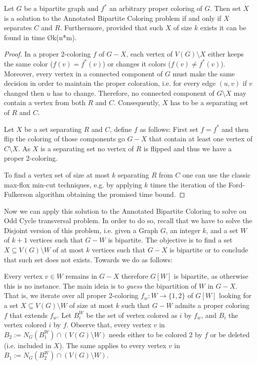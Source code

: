 \begin{lemma}\label{lemma:annotated-bipartite-coloring}
  Let $G$ be a bipartite graph and $f^*$ an arbitrary proper coloring of $G$.
  Then set $X$ is a solution to the Annotated Bipartite Coloring problem if and only if $X$ separates $C$ and $R$.
  Furthermore, provided that such $X$ of size $k$ exists it can be found in time \O{k(n*m)}.
\end{lemma}
\begin{proof}
  In a proper 2-coloring $f$ of $G-X$, each vertex of $V(G) \setminus X$ either keeps the same color ($f(v)=f^*(v)$) or changes it colors ($f(v) \neq f^*(v)$).
  Moreover, every vertex in a connected component of $G$ must make the same decision in order to maintain the proper coloration, i.e. for every edge $(u,v)$ if $v$ changed then $u$ has to change.
  Therefore, no connected component of $G \setminus X$ may contain a vertex from both $R$ and $C$.
  Consequently, $X$ has to be a separating set of $R$ and $C$.

  Let $X$ be a set separating $R$ and $C$, define $f$ as follows: First set $f=f^*$ and then flip the coloring of those components go $G-X$ that contain at least one vertex of $C \setminus X$.
  As $X$ is a separating set no vertex of $R$ is flipped and thus we have a proper 2-coloring.

  To find a  vertex set of size at most $k$ separating $R$ from $C$ one can use the classic max-flox min-cut techniques,
  e.g. by applying $k$ times the iteration of the Ford-Fulkerson algorithm obtaining the promised time bound. %
\end{proof}

Now we can apply this solution to the Annotated Bipartite Coloring to solve ou Odd Cycle transversal problem.
In order to do so, recall that we have to solve the Disjoint version of this problem,
i.e. given  a Graph $G$, an integer $k$, and a set $W$ of $k+1$ vertices such that $G-W$ is bipartite.
The objective is to find a set $X \subseteq V(G) \setminus W$ of at most $k$ vertices such that $G-X$ is bipartite or to conclude that such set does not exists.
Towards we do as follows:

Every vertex $v \in W$ remains in $G-X$ therefore $G[W]$ is bipartite, as otherwise this is no instance. The main ideia is to \emph{guess} the bipartition of $W$ in $G-X$.
That is, we iterate over all proper 2-coloring $f_w: W \rightarrow \{1,2\}$ of $G[W]$ looking for a set $X \subseteq V(G) \setminus W$ of size at most $k$
such that $G-W$ admits a proper coloring $f$ that extends $f_w$. Let $B_i^W$ be the set of vertex colored as $i$ by $f_w$, and $B_i$ the vertex colored $i$ by $f$.
Observe that, every vertex $v$ in $B_2 := N_G(B_1^W) \cap (V(G) \setminus W)$ needs either to be colored 2 by $f$ or be deleted (i.e. included in $X$).
The same applies to every vertex $v$ in  $B_1 := N_G(B_2^W) \cap (V(G) \setminus W)$.

